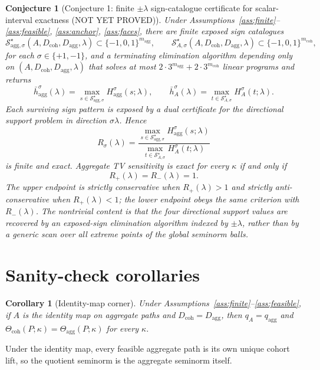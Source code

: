 \documentclass[11pt]{article}
\theoremstyle{definition}
\theoremstyle{plain}
\newtheorem{conjecture}{Conjecture}
\newtheorem{corollary}{Corollary}
\theoremstyle{remark}
\begin{document}
\begin{conjecture}[Conjecture 1: finite \(\pm\lambda\) sign-catalogue certificate for scalar-interval exactness {\normalfont (NOT YET PROVED)}]\label{conj:distortion}
Under Assumptions~\ref{ass:finite}--\ref{ass:feasible}, \ref{ass:anchor}, \ref{ass:faces}, there are finite exposed sign catalogues
\[
\mathcal S_{\mathrm{agg},\sigma}^\star(A,D_{\mathrm{coh}},D_{\mathrm{agg}},\lambda)
\subset \{-1,0,1\}^{m_{\mathrm{agg}}},
\qquad
\mathcal S_{A,\sigma}^\star(A,D_{\mathrm{coh}},D_{\mathrm{agg}},\lambda)
\subset \{-1,0,1\}^{m_{\mathrm{coh}}},
\]
for each \(\sigma\in\{+1,-1\}\), and a terminating elimination algorithm depending only on \((A,D_{\mathrm{coh}},D_{\mathrm{agg}},\lambda)\) that solves at most \(2\cdot 3^{m_{\mathrm{agg}}}+2\cdot 3^{m_{\mathrm{coh}}}\) linear programs and returns
\[
\bar h_{\mathrm{agg}}^\sigma(\lambda)
=
\max_{s\in\mathcal S_{\mathrm{agg},\sigma}^\star}
H_{\mathrm{agg}}^\sigma(s;\lambda),
\qquad
\bar h_A^\sigma(\lambda)
=
\max_{t\in\mathcal S_{A,\sigma}^\star}
H_A^\sigma(t;\lambda).
\]
Each surviving sign pattern is exposed by a dual certificate for the directional support problem in direction \(\sigma\lambda\). Hence
\[
R_\sigma(\lambda)
=
\frac{
\max_{s\in\mathcal S_{\mathrm{agg},\sigma}^\star}
H_{\mathrm{agg}}^\sigma(s;\lambda)
}{
\max_{t\in\mathcal S_{A,\sigma}^\star}
H_A^\sigma(t;\lambda)
}
\]
is finite and exact. Aggregate TV sensitivity is exact for every \(\kappa\) if and only if
\[
R_+(\lambda)=R_-(\lambda)=1.
\]
The upper endpoint is strictly conservative when \(R_+(\lambda)>1\) and strictly anti-conservative when \(R_+(\lambda)<1\); the lower endpoint obeys the same criterion with \(R_-(\lambda)\). The nontrivial content is that the four directional support values are recovered by an exposed-sign elimination algorithm indexed by \(\pm\lambda\), rather than by a generic scan over all extreme points of the global seminorm balls.
\end{conjecture}

\section{Sanity-check corollaries}
\begin{corollary}[Identity-map corner]\label{cor:identity}
Under Assumptions~\ref{ass:finite}--\ref{ass:feasible}, if \(A\) is the identity map on aggregate paths and \(D_{\mathrm{coh}}=D_{\mathrm{agg}}\), then \(q_A=q_{\mathrm{agg}}\) and \(\Theta_{\mathrm{coh}}(P;\kappa)=\Theta_{\mathrm{agg}}(P;\kappa)\) for every \(\kappa\).
\end{corollary}
Under the identity map, every feasible aggregate path is its own unique cohort lift, so the quotient seminorm is the aggregate seminorm itself.
\end{document}
